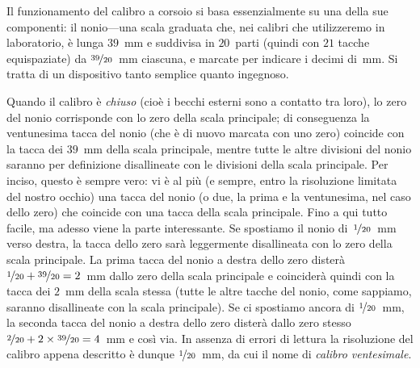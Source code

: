 Il funzionamento del calibro a corsoio si basa essenzialmente su una della
sue componenti: il nonio---una scala graduata che, nei calibri che utilizzeremo
in laboratorio, è lunga $39$~mm e suddivisa in $20$~parti (quindi con
$21$ tacche equispaziate) da $\nicefrac{39}{20}$~mm ciascuna, e marcate per
indicare i decimi di~mm. Si tratta di un dispositivo tanto semplice quanto
ingegnoso.

\begin{figure}[!htbp]
\end{figure}

Quando il calibro è \emph{chiuso} (cioè i becchi esterni sono a contatto
tra loro), lo zero del nonio corrisponde con lo zero della scala principale; di
conseguenza la ventunesima tacca del nonio (che è di nuovo marcata con uno
zero) coincide con la tacca dei $39$~mm della scala principale, mentre tutte le
altre divisioni del nonio saranno per definizione disallineate con le divisioni
della scala principale. Per inciso, questo è sempre vero: vi è al più
(e sempre, entro la risoluzione limitata del nostro occhio) una tacca del nonio
(o due, la prima e la ventunesima, nel caso dello zero) che coincide con una
tacca della scala principale.
Fino a qui tutto facile, ma adesso viene la parte interessante. Se spostiamo il
nonio di~$\nicefrac{1}{20}$~mm verso destra, la tacca dello zero sarà
leggermente disallineata con lo zero della scala principale.
La prima tacca del nonio a destra dello zero disterà
$\nicefrac{1}{20} + \nicefrac{39}{20} = 2$~mm dallo zero della scala principale
e coinciderà quindi con la tacca dei $2$~mm della scala stessa (tutte le
altre tacche del nonio, come sappiamo, saranno disallineate con la scala
principale). Se ci spostiamo ancora di $\nicefrac{1}{20}$~mm, la seconda tacca
del nonio a destra dello zero disterà dallo zero stesso 
$\nicefrac{2}{20} + 2 \times \nicefrac{39}{20} = 4$~mm e così via.
In assenza di errori di lettura la risoluzione del calibro appena descritto
è dunque $\nicefrac{1}{20}$~mm, da cui il nome di \emph{calibro ventesimale}.



